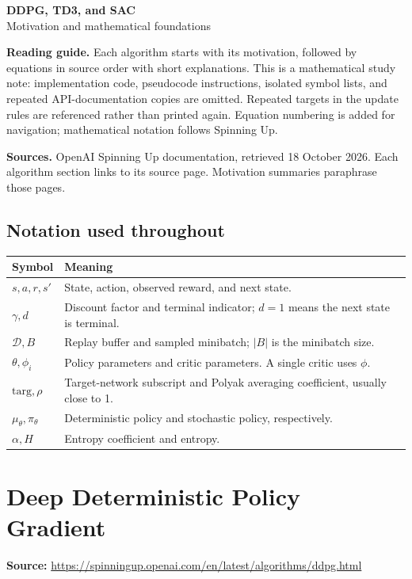\documentclass[11pt,a4paper]{article}
\begin{document}
\begin{center}{\LARGE\bfseries DDPG, TD3, and SAC}\\[6pt]{\large Motivation and mathematical foundations}\end{center}
\textbf{Reading guide.} Each algorithm starts with its motivation, followed by equations in source order with short explanations. This is a mathematical study note: implementation code, pseudocode instructions, isolated symbol lists, and repeated API-documentation copies are omitted. Repeated targets in the update rules are referenced rather than printed again. Equation numbering is added for navigation; mathematical notation follows Spinning Up.

\textbf{Sources.} OpenAI Spinning Up documentation, retrieved 18 October 2026. Each algorithm section links to its source page. Motivation summaries paraphrase those pages.
\subsection*{Notation used throughout}
\begin{tabular}{@{}p{.25\linewidth}p{.69\linewidth}@{}}\toprule
Symbol & Meaning\\\midrule
$s,a,r,s'$ & State, action, observed reward, and next state.\\
$\gamma,d$ & Discount factor and terminal indicator; $d=1$ means the next state is terminal.\\
$\mathcal D,B$ & Replay buffer and sampled minibatch; $|B|$ is the minibatch size.\\
$\theta,\phi_i$ & Policy parameters and critic parameters. A single critic uses $\phi$.\\
$\mathrm{targ},\rho$ & Target-network subscript and Polyak averaging coefficient, usually close to 1.\\
$\mu_\theta,\pi_\theta$ & Deterministic policy and stochastic policy, respectively.\\
$\alpha,H$ & Entropy coefficient and entropy.\\\bottomrule
\end{tabular}
\tableofcontents


\clearpage

\section{Deep Deterministic Policy Gradient}

\textbf{Source:} \url{https://spinningup.openai.com/en/latest/algorithms/ddpg.html}
\end{document}
